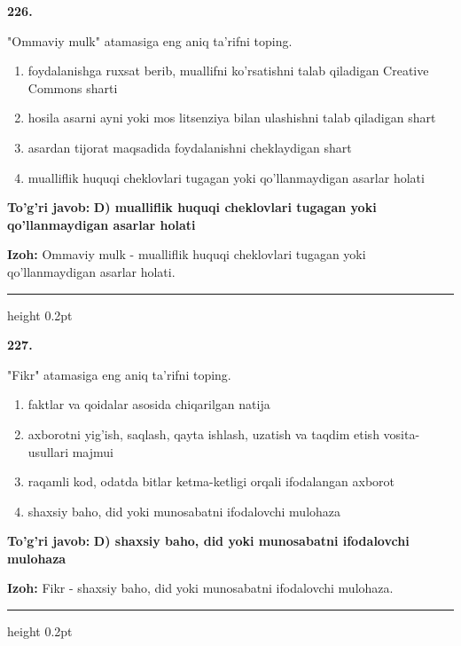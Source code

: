 \documentclass[10pt,a4paper,oneside]{article}
\begin{document}
\noindent\textbf{\color{ink}226.}
\par
"Ommaviy mulk" atamasiga eng aniq ta'rifni toping.
\begin{enumerate}[label=\Alph*),leftmargin=9mm]
\item foydalanishga ruxsat berib, muallifni ko'rsatishni talab qiladigan Creative Commons sharti
\item hosila asarni ayni yoki mos litsenziya bilan ulashishni talab qiladigan shart
\item asardan tijorat maqsadida foydalanishni cheklaydigan shart
\item mualliflik huquqi cheklovlari tugagan yoki qo'llanmaydigan asarlar holati
\end{enumerate}
\begin{tcolorbox}[enhanced,breakable,colback=teal!4,colframe=teal!50!black,boxrule=0.5pt,arc=1.1mm,left=3mm,right=3mm,top=1.7mm,bottom=1.7mm,before skip=2mm,after skip=2mm]
\textbf{\color{teal}To'g'ri javob:} \textbf{D) mualliflik huquqi cheklovlari tugagan yoki qo'llanmaydigan asarlar holati}
\par\smallskip
\textbf{Izoh:} Ommaviy mulk - mualliflik huquqi cheklovlari tugagan yoki qo'llanmaydigan asarlar holati.
\end{tcolorbox}
\vspace{2mm}\hrule height 0.2pt \vspace{3mm}

\noindent\textbf{\color{ink}227.}
\par
"Fikr" atamasiga eng aniq ta'rifni toping.
\begin{enumerate}[label=\Alph*),leftmargin=9mm]
\item faktlar va qoidalar asosida chiqarilgan natija
\item axborotni yig'ish, saqlash, qayta ishlash, uzatish va taqdim etish vosita-usullari majmui
\item raqamli kod, odatda bitlar ketma-ketligi orqali ifodalangan axborot
\item shaxsiy baho, did yoki munosabatni ifodalovchi mulohaza
\end{enumerate}
\begin{tcolorbox}[enhanced,breakable,colback=teal!4,colframe=teal!50!black,boxrule=0.5pt,arc=1.1mm,left=3mm,right=3mm,top=1.7mm,bottom=1.7mm,before skip=2mm,after skip=2mm]
\textbf{\color{teal}To'g'ri javob:} \textbf{D) shaxsiy baho, did yoki munosabatni ifodalovchi mulohaza}
\par\smallskip
\textbf{Izoh:} Fikr - shaxsiy baho, did yoki munosabatni ifodalovchi mulohaza.
\end{tcolorbox}
\vspace{2mm}\hrule height 0.2pt \vspace{3mm}
\end{document}
